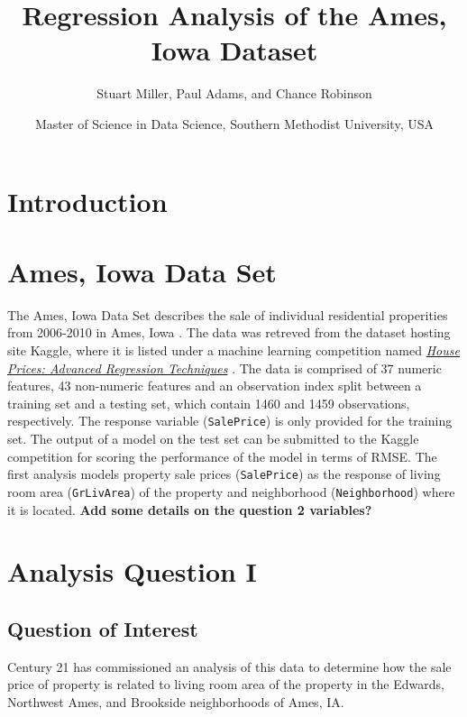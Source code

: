 \documentclass[american,]{article}
\title{Regression Analysis of the Ames, Iowa Dataset}
\author{Stuart Miller, Paul Adams, and Chance Robinson}
\date{Master of Science in Data Science, Southern Methodist University, USA}
\begin{document}
\maketitle

\hypertarget{introduction}{%
\section{Introduction}\label{introduction}}

\citet{Sleuth}

\hypertarget{ames-iowa-data-set}{%
\section{Ames, Iowa Data Set}\label{ames-iowa-data-set}}

The Ames, Iowa Data Set describes the sale of individual residential
properities from 2006-2010 in Ames, Iowa \cite{Cock}. The data was
retreved from the dataset hosting site Kaggle, where it is listed under
a machine learning competition named
\href{https://www.kaggle.com/c/house-prices-advanced-regression-techniques/overview}{\textit{House Prices: Advanced Regression Techniques}}
\cite{Kaggle2016}. The data is comprised of 37 numeric features, 43
non-numeric features and an observation index split between a training
set and a testing set, which contain 1460 and 1459 observations,
respectively. The response variable (\texttt{SalePrice}) is only
provided for the training set. The output of a model on the test set can
be submitted to the Kaggle competition for scoring the performance of
the model in terms of RMSE. The first analysis models property sale
prices (\texttt{SalePrice}) as the response of living room area
(\texttt{GrLivArea}) of the property and neighborhood
(\texttt{Neighborhood}) where it is located. \textbf{Add some details on
the question 2 variables?}

\hypertarget{analysis-question-i}{%
\section{Analysis Question I}\label{analysis-question-i}}

\hypertarget{question-of-interest}{%
\subsection{Question of Interest}\label{question-of-interest}}

Century 21 has commissioned an analysis of this data to determine how
the sale price of property is related to living room area of the
property in the Edwards, Northwest Ames, and Brookside neighborhoods of
Ames, IA.
\end{document}
